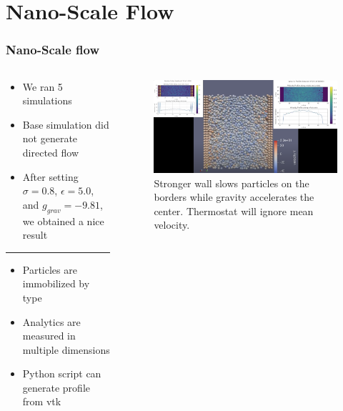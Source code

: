 \section{Nano-Scale Flow}
\label{sec:nano}

\begin{frame}
    \frametitle{Nano-Scale flow}
    
    \begin{columns}
        \begin{column}{0.3\textwidth}
            \begin{itemize}
                \item We ran 5 simulations
                \item Base simulation did not generate directed flow
                \item After setting $\sigma = 0.8$, $\epsilon = 5.0$, and $g_{grav}=-9.81$, we obtained a nice result
            \end{itemize}

            \vspace{7pt}
            \hrule
            \vspace{7pt}

            \begin{itemize}
                \item Particles are immobilized by type
                \item Analytics are measured in multiple dimensions
                \item Python script can generate profile from vtk
            \end{itemize}
        \end{column}
        \begin{column}{.7\textwidth}
            \begin{figure}
                \includegraphics[width=\columnwidth]{../../res/Stronger_walls_nano_flow.png}
                \caption{Stronger wall slows particles on the borders while gravity accelerates the center. Thermostat will ignore mean velocity. }
                \label{fig:strong-walls}
            \end{figure}
        \end{column}
    \end{columns}
    
    
\end{frame}